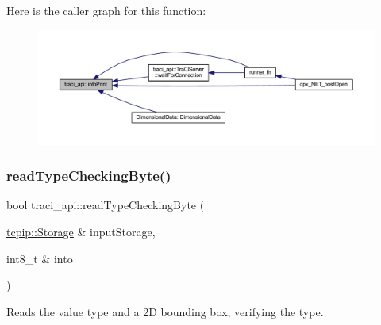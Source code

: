 Here is the caller graph for this function\+:\nopagebreak
\begin{figure}[H]
\begin{center}
\leavevmode
\includegraphics[width=350pt]{namespacetraci__api_a3d103fa606d4762c375bac42c66f62a8_icgraph}
\end{center}
\end{figure}
\mbox{\label{namespacetraci__api_aee58441392da7b83ecd8c8831271e945}} 
\subsubsection{\texorpdfstring{read\+Type\+Checking\+Byte()}{readTypeCheckingByte()}}
{\footnotesize\ttfamily bool traci\+\_\+api\+::read\+Type\+Checking\+Byte (\begin{DoxyParamCaption}\item[{\hyperlink{classtcpip_1_1_storage}{tcpip\+::\+Storage} \&}]{input\+Storage,  }\item[{int8\+\_\+t \&}]{into }\end{DoxyParamCaption})}



Reads the value type and a 2D bounding box, verifying the type. 


